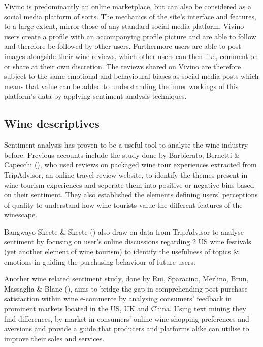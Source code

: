 \documentclass[11pt,preprint]{elsarticle}
\numberwithin{equation}{section}
\numberwithin{figure}{section}
\numberwithin{table}{section}
\begin{document}
Vivino is predominantly an online marketplace, but can also be
considered as a social media platform of sorts. The mechanics of the
site's interface and features, to a large extent, mirror those of any
standard social media platform. Vivino users create a profile with an
accompanying profile picture and are able to follow and therefore be
followed by other users. Furthermore users are able to post images
alongside their wine reviews, which other users can then like, comment
on or share at their own discretion. The reviews shared on Vivino are
therefore subject to the same emotional and behavioural biases as social
media posts which means that value can be added to understanding the
inner workings of this platform's data by applying sentiment analysis
techniques.

\subsection{Wine descriptives}\label{wine-descriptives}

Sentiment analysis has proven to be a useful tool to analyse the wine
industry before. Previous accounts include the study done by Barbierato,
Bernetti \& Capecchi (), who used
reviews on packaged wine tour experiences extracted from TripAdvisor, an
online travel review website, to identify the themes present in wine
tourism experiences and seperate them into positive or negative bins
based on their sentiment. They also established the elements defining
users' perceptions of quality to understand how wine tourists value the
different features of the winescape.

Bangwayo-Skeete \& Skeete () also draw
on data from TripAdvisor to analyse sentiment by focusing on user's
online discussions regarding 2 US wine festivals (yet another element of
wine tourism) to identify the usefulness of topics \& emotions in
guiding the purchasing behaviour of future users.

Another wine related sentiment study, done by Rui, Sparacino, Merlino,
Brun, Massaglia \& Blanc (), aims to
bridge the gap in comprehending post-purchase satisfaction within wine
e-commerce by analysing consumers' feedback in prominent markets located
in the US, UK and China. Using text mining they find differences, by
market in consumers' online wine shopping preferences and aversions and
provide a guide that producers and platforms alike can utilise to
improve their sales and services.
\end{document}
